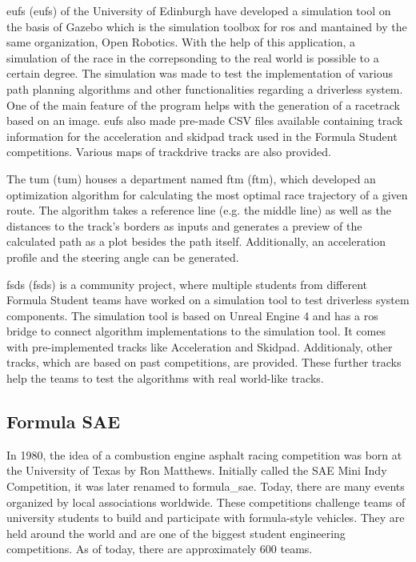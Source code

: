 \acrshort{eufs} (\acrlong{eufs}) of the University of Edinburgh have developed a simulation tool on the basis of Gazebo which is the simulation toolbox for \acrshort{ros} and mantained by the same organization, Open Robotics. With the help of this application, a simulation of the race in the correpsonding to the real world is possible to a certain degree. The simulation was made to test the implementation of various path planning algorithms and other functionalities regarding a driverless system. One of the main feature of the program helps with the generation of a racetrack based on an image. \acrshort{eufs} also made pre-made CSV files available containing track information for the acceleration and skidpad track used in the Formula Student competitions. Various maps of trackdrive tracks are also provided.
\cite{eufs_sim_gitlab}

The \acrlong{tum} (\acrshort{tum}) houses a department named \acrlong{ftm} (\acrshort{ftm}), which developed an optimization algorithm for calculating the most optimal race trajectory of a given route. The algorithm takes a reference line (e.g. the middle line) as well as the distances to the track's borders as inputs and generates a preview of the calculated path as a plot besides the path itself. Additionally, an acceleration profile and the steering angle can be generated.
\cite{tumftm_optimization_algoritm}

\acrshort{fsds} (\acrlong{fsds}) is a community project, where multiple students from different Formula Student teams have worked on a simulation tool to test driverless system components. The simulation tool is based on Unreal Engine 4 \cite{unreal_engine} and has a \acrshort{ros} bridge to connect algorithm implementations to the simulation tool. It comes with pre-implemented tracks like Acceleration and Skidpad. Additionaly, other tracks, which are based on past competitions, are provided. These further tracks help the teams to test the algorithms with real world-like tracks.
\cite{fsds_github}

\subsection{Formula SAE}
In 1980, the idea of a combustion engine asphalt racing competition was born at the University of Texas by Ron Matthews. Initially called the SAE Mini Indy Competition, it was later renamed to \Gls{formula_sae}. Today, there are many events organized by local associations worldwide.
\cite{formula_sae}
These competitions challenge teams of university students to build and participate with formula-style vehicles. They are held around the world and are one of the biggest student engineering competitions. As of today, there are approximately 600 teams. \cite{sae_student_events}

